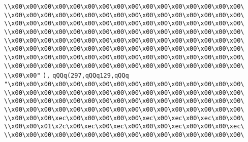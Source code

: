 \verb|\\x00\x00\x00\x00\x00\x00\x00\x00\x00\x00\x00\x00\x00\x00\x00\x00\|\newline
\verb|\\x00\x00\x00\x00\x00\x00\x00\x00\x00\x00\x00\x00\x00\x00\x00\x00\|\newline
\verb|\\x00\x00\x00\x00\x00\x00\x00\x00\x00\x00\x00\x00\x00\x00\x00\x00\|\newline
\verb|\\x00\x00\x00\x00\x00\x00\x00\x00\x00\x00\x00\x00\x00\x00\x00\x00\|\newline
\verb|\\x00\x00\x00\x00\x00\x00\x00\x00\x00\x00\x00\x00\x00\x00\x00\x00\|\newline
\verb|\\x00\x00\x00\x00\x00\x00\x00\x00\x00\x00\x00\x00\x00\x00\x00\x00\|\newline
\verb|\\x00\x00\x00\x00\x00\x00\x00\x00\x00\x00\x00\x00\x00\x00\x00\x00\|\newline
\verb|\\x00\x00\x00\x00\x00\x00\x00\x00\x00\x00\x00\x00\x00\x00\x00\x00\|\newline
\verb|\\x00\x00"|\newline
\verb|),|\newline
\verb|qQQq(297,qQQq129,qQQq|\newline
\verb|"\x00\x00\x00\x00\x00\x00\x00\x00\x00\x00\x00\x00\x00\x00\x00\x00\|\newline
\verb|\\x00\x00\x00\x00\x00\x00\x00\x00\x00\x00\x00\x00\x00\x00\x00\x00\|\newline
\verb|\\x00\x00\x00\x00\x00\x00\x00\x00\x00\x00\x00\x00\x00\x00\x00\x00\|\newline
\verb|\\x00\x00\x00\x00\x00\x00\x00\x00\x00\x00\x00\x00\x00\x00\x00\x00\|\newline
\verb|\\x00\x00\x00\xec\x00\x00\x00\x00\x00\xec\x00\xec\x00\xec\x00\x00\|\newline
\verb|\\x00\x00\x01\x2c\x00\xec\x00\xec\x00\x00\x00\xec\x00\x00\x00\xec\|\newline
\verb|\\x00\x00\x00\x00\x00\x00\x00\x00\x00\x00\x00\x00\x00\x00\x00\x00\|\newline
